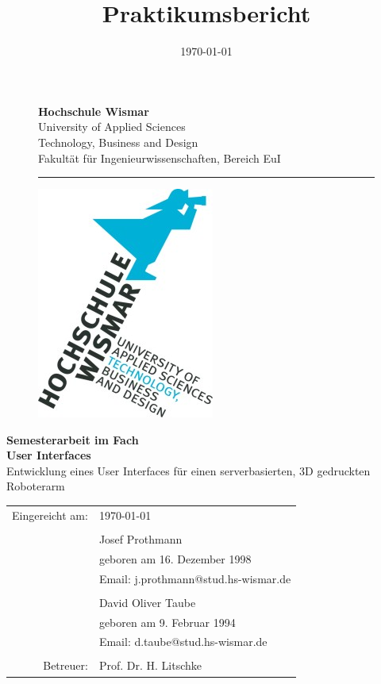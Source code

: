 \documentclass[12pt,					%
							 oneside,			%
							 a4paper,			%
							 halfparskip,		%
							 liststotoc,			%
							 bibtotoc,			%
							 fleqn,				%
							 pointlessnumbers]	%
							 {scrreprt}
\title{Praktikumsbericht}
\author{\Verfasserj \VerfasserD}
\date{\today{}}
\makeatletter
\newcommand{\VerfasserJ}{Josef Prothmann}
\newcommand{\EmailJ}{j.prothmann@stud.hs-wismar.de}
\newcommand{\GeburtstagJ}{16. Dezember 1998}
\newcommand{\VerfasserD}{David Oliver Taube}
\newcommand{\EmailD}{d.taube@stud.hs-wismar.de}
\newcommand{\GeburtstagD}{9. Februar 1994}
\newcommand{\Titel}{Entwicklung eines User Interfaces f\"ur einen serverbasierten, 3D gedruckten Roboterarm}
\newcommand{\Betreuer}{Prof. Dr. H. Litschke}
\makeatother
\begin{document}

	\renewcommand\lstlistingname{Code}
	\renewcommand\lstlistlistingname{Codeverzeichnis}
	
	\begin{titlepage}
		\setlength\headsep{-5mm}
		\begin{figure}[!h]
			\begin{minipage}{0.8\textwidth}
				\textbf{Hochschule Wismar} \\
				University of Applied Sciences \\
				Technology, Business and Design \\
				Fakultät für Ingenieurwissenschaften, Bereich EuI \\
			\rule{\textwidth}{0.5pt}
			\end{minipage}
			\begin{minipage}[r]{0.1\textwidth}
				\begin{flushright}
					\includegraphics[height=6\baselineskip]{pictures/HS-Wismar_Logo-FIW_2010-01.jpg}
				\end{flushright}
			\end{minipage}
		\end{figure}
		\vspace*{6cm}
		\begin{center}
			\Huge
			\textbf{Semesterarbeit im Fach\\ User Interfaces} \\
			\vspace{2cm}
			\large \Titel
			\begin{table}[b]
				\begin{tabular}{rl}
					
					Eingereicht am: &\today \\
					\\
					& \VerfasserJ \\ 
					& geboren am \GeburtstagJ \\ 
					& Email: \EmailJ \\
					\\
					& \VerfasserD\\ 
					& geboren am \GeburtstagD \\ 
					& Email: \EmailD \\
					\\
					Betreuer: & \Betreuer \\


\end{tabular}
\end{table}
\end{center}
\end{titlepage}
\end{document}
